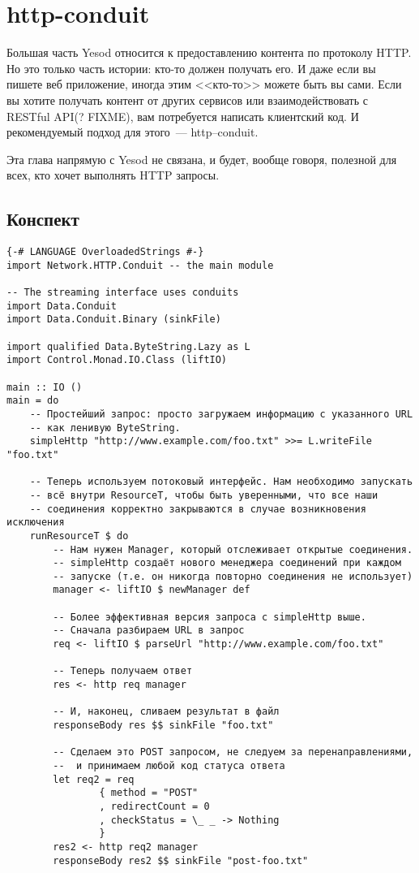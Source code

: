 \chapter{http-conduit}
Большая часть Yesod относится к предоставлению контента по протоколу
HTTP. Но это только часть истории: кто-то должен получать его. И даже
если вы пишете веб приложение, иногда этим <<кто-то>> можете быть вы
сами. Если вы хотите получать контент от других сервисов или
взаимодействовать с RESTful API(? FIXME), вам потребуется написать
клиентский код. И рекомендуемый подход для этого~---
http--conduit.

Эта глава напрямую с Yesod не связана, и будет, вообще говоря, полезной для
всех, кто хочет выполнять HTTP запросы.

\section{Конспект}
\begin{lstlisting}
{-# LANGUAGE OverloadedStrings #-}
import Network.HTTP.Conduit -- the main module

-- The streaming interface uses conduits
import Data.Conduit
import Data.Conduit.Binary (sinkFile)

import qualified Data.ByteString.Lazy as L
import Control.Monad.IO.Class (liftIO)

main :: IO ()
main = do
    -- Простейший запрос: просто загружаем информацию с указанного URL
    -- как ленивую ByteString.
    simpleHttp "http://www.example.com/foo.txt" >>= L.writeFile "foo.txt"

    -- Теперь используем потоковый интерфейс. Нам необходимо запускать
    -- всё внутри ResourceT, чтобы быть уверенными, что все наши
    -- соединения корректно закрываются в случае возникновения исключения
    runResourceT $ do
        -- Нам нужен Manager, который отслеживает открытые соединения.
        -- simpleHttp создаёт нового менеджера соединений при каждом
        -- запуске (т.е. он никогда повторно соединения не использует)
        manager <- liftIO $ newManager def

        -- Более эффективная версия запроса с simpleHttp выше.
        -- Сначала разбираем URL в запрос
        req <- liftIO $ parseUrl "http://www.example.com/foo.txt"

        -- Теперь получаем ответ
        res <- http req manager

        -- И, наконец, сливаем результат в файл
        responseBody res $$ sinkFile "foo.txt"

        -- Сделаем это POST запросом, не следуем за перенаправлениями,
        --  и принимаем любой код статуса ответа
        let req2 = req
                { method = "POST"
                , redirectCount = 0
                , checkStatus = \_ _ -> Nothing
                }
        res2 <- http req2 manager
        responseBody res2 $$ sinkFile "post-foo.txt"
\end{lstlisting} %

